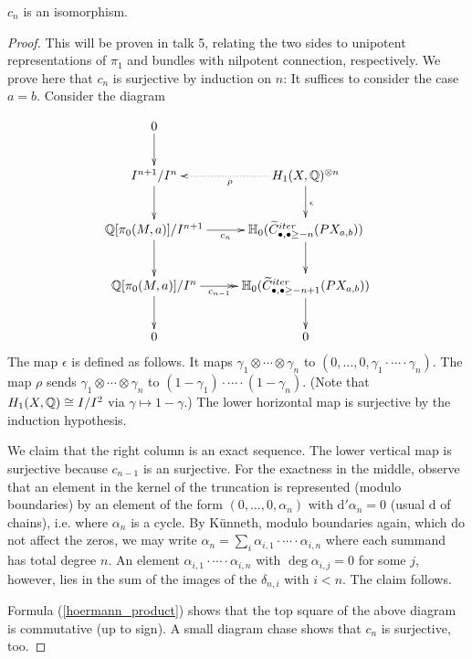 \begin{thm}[Chen]
$c_n$ is an isomorphism.
\end{thm}
\begin{proof}
This will be proven in talk 5, relating the two sides to unipotent representations of $\pi_1$ and bundles with nilpotent connection, respectively. 
We prove here that $c_n$ is surjective by induction on $n$:
It suffices to consider the case $a=b$. Consider the diagram

\[ 
\xymatrix{
0 \ar[d] \\
I^{n+1}/I^n \ar[d] & H_{1}(X, \Q)^{\otimes n} \ar@{.>}[l]^{\rho} \ar[d]^{\epsilon} \\
\Q[\pi_0(M, a)]/I^{n+1} \ar[d] \ar[r]_-{c_{n}} & \mathbb{H}_0(\widetilde{C}_{\bullet,\bullet  \ge -n}^{iter}(PX_{a,b})) \ar[d] \\
\Q[\pi_0(M, a)]/I^{n} \ar[d] \ar@{->>}[r]_-{c_{n-1}} & \mathbb{H}_0(\widetilde{C}_{\bullet,\bullet  \ge -n+1}^{iter}(PX_{a,b})) \ar[d] \\
0 & 0 
}
\]
The map $\epsilon$ is defined as follows. It maps $\gamma_1 \otimes \cdots \otimes \gamma_n$ to 
$(0, \dots, 0, \gamma_1 \cdot \cdots \cdot \gamma_n)$. 
The map $\rho$ sends $\gamma_1 \otimes \cdots \otimes \gamma_n$ to $(1-\gamma_1) \cdot \cdots \cdot (1-\gamma_n)$. (Note that $H_1(X, \mathbb{Q}) \cong I/I^2$ via $\gamma \mapsto 1-\gamma$.)
The lower horizontal map is surjective by the induction hypothesis. 

We claim that the right column is an exact sequence. The lower vertical map is surjective because $c_{n-1}$ is an surjective. 
For the exactness in the middle, observe that an element in the kernel of the truncation is represented (modulo boundaries) by an element of the form
$(0, \dots, 0, \alpha_n)$ with $\mathrm{d}' \alpha_n = 0$ (usual $\mathrm{d}$ of chains), i.e. where $\alpha_n$ is a cycle.
By K\"unneth, modulo boundaries again, which do not affect the zeros, we may write $\alpha_n = \sum_i \alpha_{i,1} \cdot \cdots \cdot \alpha_{i,n}$ where each summand has total degree $n$.
An element $\alpha_{i,1} \cdot \cdots \cdot \alpha_{i,n}$ with $\deg \alpha_{i,j} = 0$ for some $j$, however, lies in the sum of the images
of the $\delta_{n,i}$ with $i<n$. The claim follows. 

Formula (\ref{hoermann_product}) shows that the top square of the above diagram is commutative (up to sign). A small diagram chase shows that $c_{n}$ is
surjective, too.
\end{proof}
 


